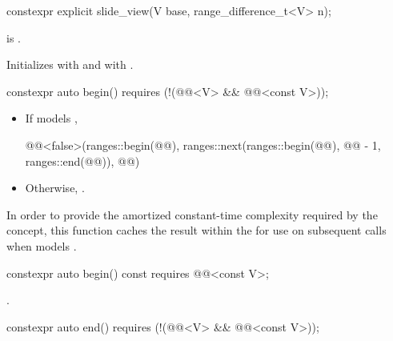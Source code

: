 \begin{itemdecl}
constexpr explicit slide_view(V base, range_difference_t<V> n);
\end{itemdecl}

\begin{itemdescr}
\pnum
\expects
{} is .

\pnum
\effects
Initializes  with  and
 with .
\end{itemdescr}

\begin{itemdecl}
constexpr auto begin()
  requires (!(@@<V> && @@<const V>));
\end{itemdecl}

\begin{itemdescr}
\pnum
\returns
\begin{itemize}
\item
If  models ,
\begin{codeblock}
@@<false>(ranges::begin(@@),
                ranges::next(ranges::begin(@@), @@ - 1, ranges::end(@@)), @@)
\end{codeblock}
\item
Otherwise, .
\end{itemize}

\pnum
\remarks
In order to provide the amortized constant-time complexity
required by the  concept,
this function caches the result within the 
for use on subsequent calls
when  models .
\end{itemdescr}

\begin{itemdecl}
constexpr auto begin() const requires @@<const V>;
\end{itemdecl}

\begin{itemdescr}
\pnum
\returns
{}.
\end{itemdescr}

\begin{itemdecl}
constexpr auto end()
  requires (!(@@<V> && @@<const V>));
\end{itemdecl}

